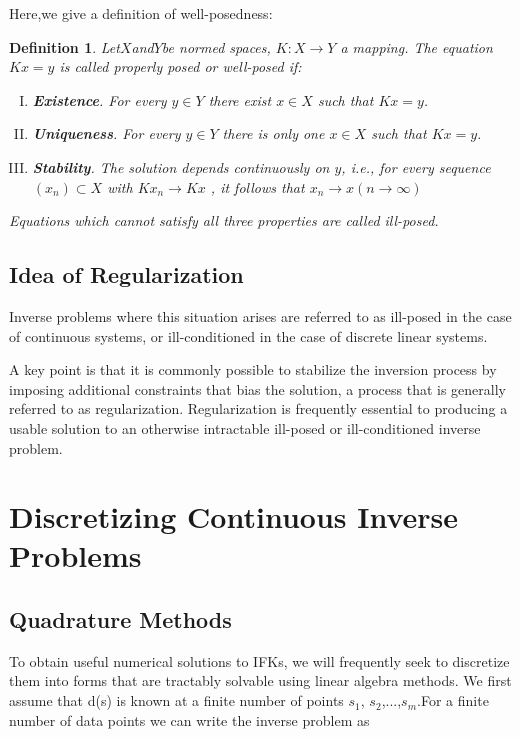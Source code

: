 \documentclass[a4paper]{article}
\newtheorem{definition}[theorem]{Definition}
\newcommand{\tmstrong}[1]{\textbf{#1}}
\newenvironment{enumerateromancap}{\begin{enumerate}[I.] }{\end{enumerate}}
\begin{document}
Here,we give a definition of well-posedness:
\begin{definition}
Let$X$and$Y$be normed spaces, $K:X\to Y$ a mapping. The equation$Kx=y$ is called properly posed or well-posed if:
\begin{enumerateromancap}
  \item {\tmstrong{Existence}}. For every $y\in Y$ there exist $x\in X$ such that $Kx=y$.
  \item {\tmstrong{Uniqueness}}. For every $y\in Y$ there is only one $x\in X$ such that $Kx=y$.
  \item {\tmstrong{Stability}}. The solution depends continuously on $y$, i.e., for every sequence $\left( {{x}_{n}} \right)\subset X$ with $K{{x}_{n}}\to Kx$ , it follows that ${{x}_{n}}\to x(n\to \infty )$
\end{enumerateromancap}
Equations which cannot satisfy all three properties are called ill-posed.
\end{definition}



\subsection{Idea of Regularization}

Inverse problems where this situation arises are referred to as ill-posed in
the case of continuous systems, or ill-conditioned in the case of discrete
linear systems.
\par
A key point is that it is commonly possible to stabilize the inversion
process by imposing additional constraints that bias the solution, a process
that is generally referred to as regularization. Regularization is frequently
essential to producing a usable solution to an otherwise intractable ill-posed
or ill-conditioned inverse problem.


\section{Discretizing Continuous Inverse Problems}

\subsection{Quadrature Methods}

To obtain useful numerical solutions to IFKs, we will frequently seek to
discretize them into forms that are tractably solvable using linear algebra
methods. We first assume that d(s) is known at a finite number of points
$s_1$, $s_2$,...,$s_m$.For a finite number of data points we can write the
inverse problem as
\end{document}
